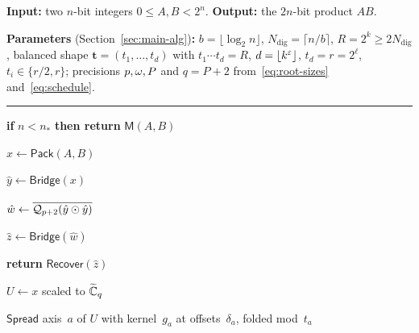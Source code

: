 {\setlength{\intextsep}{9.5pt plus 2pt minus 1.5pt}
\begin{algorithm}[!ht]
\small
\caption{Integer multiplication on one power-of-two grid}\label{alg:main}
\vspace{1pt}
\noindent\textbf{Input:} two $n$-bit integers $0\le A,B<2^n$. \quad \textbf{Output:} the $2n$-bit product $AB$.\par\vspace{1pt}
\noindent\textbf{Parameters} (Section~\ref{sec:main-alg})\textbf{:} $b=\lfloor\log_2 n\rfloor$, $N_{\mathrm{dig}}=\lceil n/b\rceil$, $R=2^k\ge 2N_{\mathrm{dig}}$, balanced shape $\mathbf t=(t_1,\dots,t_d)$ with $t_1\cdots t_d=R$, $d=\lfloor k^\varepsilon\rfloor$, $t_d=r=2^\ell$, $t_i\in\{r/2,r\}$; precisions $p,\omega,P$ and $q=P+2$ from~\eqref{eq:root-sizes} and~\eqref{eq:schedule}.
\vspace{2pt}\hrule\vspace{1.5pt}

\begin{algorithmic}[1]
\State \textbf{if} $n < n_*$ \textbf{then return} $\mathsf M(A,B)$ 

\State $x \gets \textsf{Pack}(A,B)$ 

\State $\hat y \gets \textsf{Bridge}(x)$ 

\State $\rule{0pt}{2.8ex}\hat w \gets \overline{\Quant_{p+2}(\hat y \odot \hat y)}$ 

\State $\hat z \gets \textsf{Bridge}(\hat w)$ 

\State \textbf{return} $\textsf{Recover}(\hat z)$ \vspace{1.5pt}

 

\State $U \gets x$ scaled to $\widetilde{\mathbb{C}}_q$

 

\State $\textsf{Spread}$ axis~$a$ of $U$ with kernel~$g_a$ at offsets~$\delta_a$, folded mod~$t_a$
\EndFor


\end{algorithmic}
\end{algorithm}}

